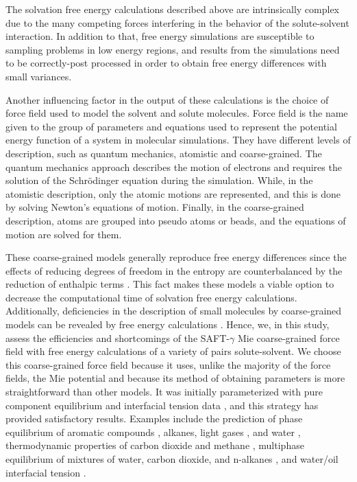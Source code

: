 The solvation free energy calculations described above are intrinsically complex due to the many competing forces interfering in the behavior of the solute-solvent interaction. In addition to that, free energy simulations are susceptible to sampling problems in low energy regions, and results from the simulations need to be correctly-post processed in order to obtain free energy differences with small variances. {Another influencing factor in the output of these calculations is the choice of force field used to model the solvent and solute molecules. Force field is the name given to the group of parameters and equations used to represent the potential energy function of a system in molecular simulations. They have different levels of description, such as quantum mechanics, atomistic and coarse-grained. The quantum mechanics approach describes the motion of electrons and requires the solution of the Schr\"{o}dinger equation during the simulation. While, in the atomistic description, only the atomic motions are represented,  and this is done by solving Newton's equations of motion. Finally, in the coarse-grained description, atoms are grouped into pseudo atoms or beads, and the equations of motion are solved for them. 
	
These coarse-grained models generally reproduce free energy differences since the effects of reducing degrees of freedom in the entropy are counterbalanced by the reduction of enthalpic terms \cite{kmiecik2016}. This fact makes these models a viable option to decrease the computational time of solvation free energy calculations. Additionally, deficiencies in the description of small molecules by coarse-grained models can be revealed by free energy calculations \cite{mobley2007,shirts2013}. Hence, we, in this study, assess the efficiencies and shortcomings of the SAFT-$\gamma$ Mie coarse-grained force field  \cite{avendano2011} with free energy calculations of a variety of pairs solute-solvent. We choose this coarse-grained force field because it uses, unlike the majority of the force fields, the Mie potential \cite{MIE} and because its method of obtaining parameters is more straightforward than other models. It was initially parameterized with pure component equilibrium and interfacial tension data \cite{avendano2011}, and this strategy has provided satisfactory results. Examples include the prediction of phase equilibrium of aromatic compounds \cite{muller2017}, alkanes, light gases \cite{herdes2015}, and water \cite{lobanova2015}, thermodynamic properties of carbon dioxide and methane \cite{cassiano1}, multiphase equilibrium of mixtures of water, carbon dioxide, and n-alkanes \cite{lobanova2016}, and water/oil interfacial tension \cite{herdes2017}.} 


